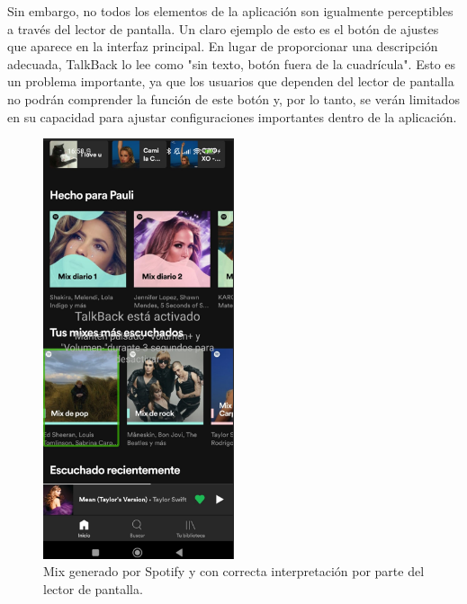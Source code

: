 \documentclass[letterpaper, 12pt]{report}
\begin{document}
Sin embargo, no todos los elementos de la aplicación son igualmente perceptibles a través del lector de pantalla. Un claro ejemplo de esto es el botón de ajustes que aparece en la interfaz principal. En lugar de proporcionar una descripción adecuada, TalkBack lo lee como "sin texto, botón fuera de la cuadrícula". Esto es un problema importante, ya que los usuarios que dependen del lector de pantalla no podrán comprender la función de este botón y, por lo tanto, se verán limitados en su capacidad para ajustar configuraciones importantes dentro de la aplicación.

\begin{figure}[H]
\centering
\includegraphics[width=0.5\textwidth]{figure27.png}
\caption{Mix generado por Spotify y con correcta interpretación por parte del lector de pantalla.}
\label{fig:27}
\end{figure}
\end{document}

